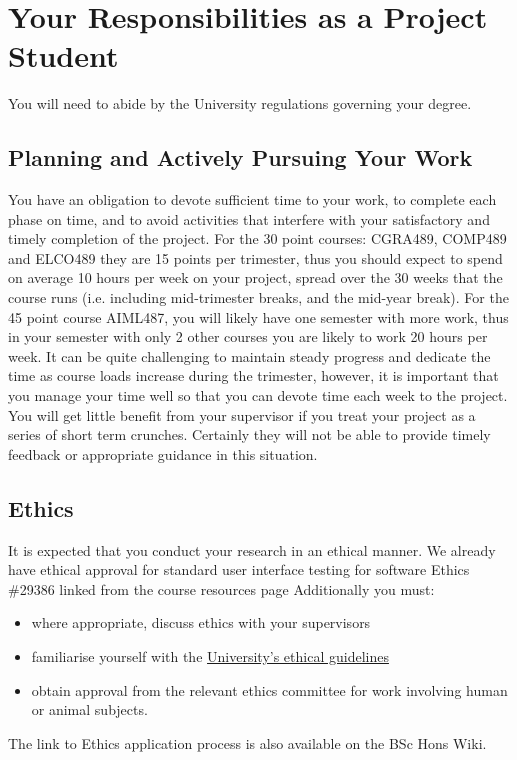 \section{Your Responsibilities as a Project Student}

You will need to abide by the University regulations governing your
degree.

\subsection{Planning and Actively Pursuing Your Work}

You have an obligation to devote sufficient time to your work, to
complete each phase on time, and to avoid activities that interfere
with your satisfactory and timely completion of the project.  
For the 30 point courses: CGRA489, COMP489 and ELCO489
they are 15 points per trimester, thus you should expect to spend 
on average 10 hours per week on your project,
spread over the 30 weeks that the course runs (i.e. including
mid-trimester breaks, and the mid-year break).  
For the 45 point course AIML487, you will likely have one semester with 
more work, thus in your semester with only 2 other courses you are likely to work 20 hours per week.
It can be quite challenging to maintain steady progress and dedicate the time as
course loads increase during the trimester, however, it is important
that you manage your time well so that you can devote time each week to the project.  
You will get little benefit from your
supervisor if you treat your project as a series of short term crunches.
Certainly they will not be able to provide timely feedback or
appropriate guidance in this situation.

\subsection{Ethics}

It is expected that you conduct your research in an ethical
manner.  We already have ethical approval for standard
user interface testing for software Ethics \#29386 linked from the course resources page
Additionally you must:
\begin{itemize}
\item where appropriate, discuss ethics with your supervisors
\item familiarise yourself with the \href{https://www.wgtn.ac.nz/research/support/ethics}{University’s ethical guidelines}
\item obtain approval from the relevant ethics committee for work involving human or animal subjects.
\end{itemize}
The link to Ethics application process is also available on the BSc Hons Wiki.

